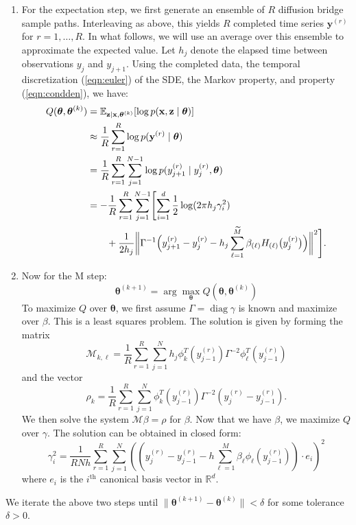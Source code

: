 \documentclass{article}
\newcommand{\btheta}{\ensuremath{\bm{\theta}}}
\newcommand{\opdiag}{\ensuremath{\operatorname{diag}}}
\newcommand{\bx}{\ensuremath{\mathbf{x}}}
\newcommand{\by}{\ensuremath{\mathbf{y}}}
\newcommand{\bz}{\ensuremath{\mathbf{z}}}
\begin{document}
\begin{enumerate}
\item For the expectation step, we first generate an ensemble of $R$ diffusion bridge sample paths.  Interleaving as above, this yields $R$ completed time series $\by^{(r)}$ for $r = 1, \ldots, R$.  In what follows, we will use an average over this ensemble to approximate the expected value.  Let $h_j$ denote the elapsed time between observations $y_j$ and $y_{j+1}$.  Using the completed data, the temporal discretization (\ref{eqn:euler}) of the SDE, the Markov property, and property (\ref{eqn:condden}), we have:
\begin{align*}
Q(\btheta, \btheta^{(k)}) &= \mathbb{E}_{\bz \mid \bx, \btheta^{(k)}} [\log p(\bx, \bz \mid \btheta)] \\
 &\approx \frac{1}{R} \sum_{r=1}^R \log p(\by^{(r)} \mid \btheta) \\
 &= \frac{1}{R} \sum_{r=1}^R \sum_{j=1}^{N-1} \log p(y_{j+1}^{(r)} \mid y_j^{(r)}, \btheta) \\
 &= -\frac{1}{R} \sum_{r=1}^R \sum_{j=1}^{N-1} \Biggl[ \sum_{i=1}^d \frac{1}{2} \log(2 \pi h_j \gamma_i^2) \\
 &\qquad + \frac{1}{2h_j} \biggl\| \Gamma^{-1} \Bigl(y_{j+1}^{(r)} - y_j^{(r)} - h_j \sum_{\ell=1}^{\widetilde{M}} \beta_{(\ell)} H_{(\ell)}\bigl(y_j^{(r)}\bigr)\Bigr) \biggr\|^2 \Biggr].
\end{align*}
\item Now for the M step:
\begin{equation}
\label{eqn:maximization}
\btheta^{(k+1)} = \arg \max_{\btheta} Q(\btheta, \btheta^{(k)})
\end{equation}
To maximize $Q$ over $\btheta$, we first assume $\Gamma = \opdiag \gamma$ is known and maximize over $\beta$.  This is a least squares problem.  The solution is given by forming the matrix
\begin{equation*}
\mathcal{M}_{k,\ell} = \frac{1}{R} \sum_{r=1}^{R} \sum_{j=1}^N h_j \phi_k^T (y_{j-1}^{(r)}) \Gamma^{-2} \phi_\ell^T (y_{j-1}^{(r)})
\end{equation*}
and the vector
\begin{equation*}
\rho_k = \frac{1}{R} \sum_{r=1}^{R} \sum_{j=1}^N \phi_k^T (y_{j-1}^{(r)}) \Gamma^{-2} (y_j^{(r)} - y_{j-1}^{(r)}).
\end{equation*}
We then solve the system $\mathcal{M} \beta = \rho$ for $\beta$.  Now that we have $\beta$, we maximize $Q$ over $\gamma$.  The solution can be obtained in closed form:
\begin{equation*}
\gamma_i^2 = \frac{1}{R N h} \sum_{r=1}^{R} \sum_{j=1}^N (( y_j^{(r)} - y_{j-1}^{(r)} - h \sum_{\ell=1}^M \beta_\ell \phi_\ell (y_{j-1}^{(r)}) ) \cdot e_i )^2
\end{equation*}
where $e_i$ is the $i^\text{th}$ canonical basis vector in $\mathbb{R}^d$.
\end{enumerate}
We iterate the above two steps until $\| \btheta^{(k+1)} - \btheta^{(k)} \| < \delta$ for some tolerance $\delta > 0$.
\end{document}
